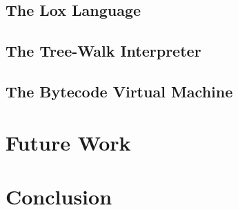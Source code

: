 \documentclass[tikz]{article}
\renewcommand{\:}{\colon}
\begin{document}
\subsection*{The Lox Language}

\subsection*{The Tree-Walk Interpreter}

\subsection*{The Bytecode Virtual Machine}

\section*{Future Work}

\section*{Conclusion}
 
\end{document}
